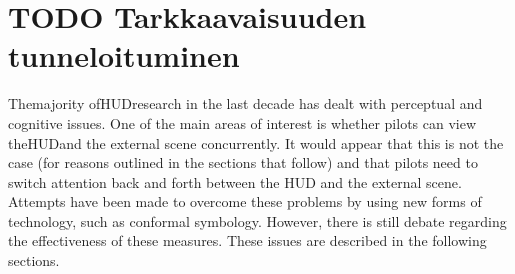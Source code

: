 \documentclass[utf8,bachelor,manualbib]{gradu3}
\begin{document}
\section{TODO Tarkkaavaisuuden tunneloituminen}

Themajority ofHUDresearch in the last decade has dealt with perceptual and cognitive
issues. One of the main areas of interest is whether pilots can view theHUDand
the external scene concurrently. It would appear that this is not the case (for reasons
outlined in the sections that follow) and that pilots need to switch attention back and
forth between the HUD and the external scene. Attempts have been made to overcome
these problems by using new forms of technology, such as conformal
symbology. However, there is still debate regarding the effectiveness of these measures.
These issues are described in the following sections.
\end{document}
